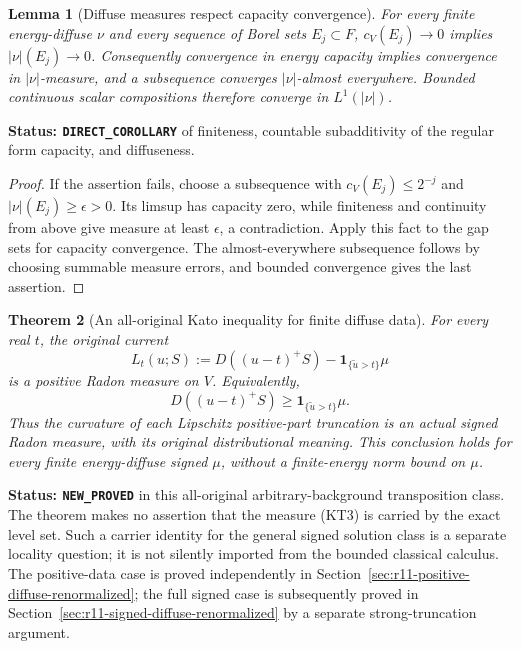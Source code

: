 \documentclass[11pt,a4paper]{article}
\numberwithin{equation}{section}
\newtheorem{theorem}{Theorem}[section]
\newtheorem{lemma}[theorem]{Lemma}
\theoremstyle{definition}
\theoremstyle{remark}
\begin{document}
\begin{lemma}[Diffuse measures respect capacity convergence]
\label{lem:r11-diffuse-capacity-absolute-continuity}
For every finite energy-diffuse $\nu$ and every sequence of Borel
sets $E_j\subset F$, $c_V(E_j)\to0$ implies $|\nu|(E_j)\to0$.
Consequently convergence in energy capacity implies convergence
in $|\nu|$-measure, and a subsequence converges $|\nu|$-almost
everywhere.  Bounded continuous scalar compositions therefore
converge in $L^1(|\nu|)$.
\end{lemma}

\noindent\textbf{Status: \texttt{DIRECT\_COROLLARY}} of finiteness,
countable subadditivity of the regular form capacity, and diffuseness.

\begin{proof}
If the assertion fails, choose a subsequence with
$c_V(E_j)\le2^{-j}$ and $|\nu|(E_j)\ge\epsilon>0$.
Its limsup has capacity zero, while finiteness and continuity
from above give measure at least $\epsilon$, a contradiction.
Apply this fact to the gap sets for capacity convergence.
The almost-everywhere subsequence follows by choosing summable
measure errors, and bounded convergence gives the last assertion.
\end{proof}

\begin{theorem}[An all-original Kato inequality for finite diffuse data]
\label{thm:r11-diffuse-original-Kato}
For every real $t$, the original current
\[
 L_t(u;S):=D((u-t)^+S)
                         -\mathbf1_{\{\widetilde u>t\}}\mu
 \tag{KT3}
\]
is a positive Radon measure on $V$.  Equivalently,
\[
              D((u-t)^+S)\ge
                           \mathbf1_{\{\widetilde u>t\}}\mu .
 \tag{KT4}
\]
Thus the curvature of each Lipschitz positive-part truncation is
an actual signed Radon measure, with its original distributional
meaning.  This conclusion holds for every finite energy-diffuse
signed $\mu$, without a finite-energy norm bound on $\mu$.
\end{theorem}

\noindent\textbf{Status: \texttt{NEW\_PROVED}} in this
all-original arbitrary-background transposition class.
The theorem makes no assertion that the measure (KT3) is
carried by the exact level set.  Such a carrier identity for
the general signed solution class is a separate locality question;
it is not silently imported from the bounded classical calculus.
The positive-data case is proved independently in
Section~\ref{sec:r11-positive-diffuse-renormalized}; the full
signed case is subsequently proved in
Section~\ref{sec:r11-signed-diffuse-renormalized} by a separate
strong-truncation argument.
\end{document}
